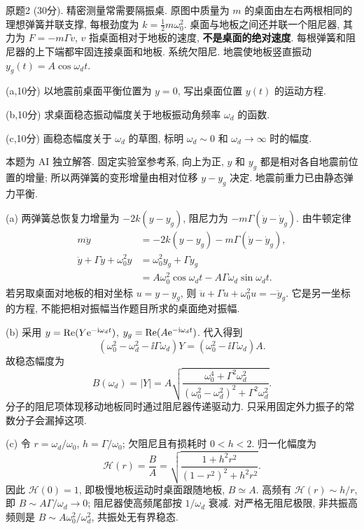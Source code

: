 \begin{exercise}\label{exam:actual1.2}
原题2 (30分). 精密测量常需要隔振桌. 原图中质量为 $m$ 的桌面由左右两根相同的理想弹簧并联支撑, 每根劲度为 $k=\tfrac12m\omega_0^2$. 桌面与地板之间还并联一个阻尼器, 其力为 $F=-m\Gamma v$, $v$ 指桌面相对于地板的速度, \textbf{不是桌面的绝对速度}. 每根弹簧和阻尼器的上下端都牢固连接桌面和地板. 系统欠阻尼. 地震使地板竖直振动 $y_g(t)=A\cos\omega_dt$.

(a,10分) 以地震前桌面平衡位置为 $y=0$, 写出桌面位置 $y(t)$ 的运动方程.

(b,10分) 求桌面稳态振动幅度关于地板振动角频率 $\omega_d$ 的函数.

(c,10分) 画稳态幅度关于 $\omega_d$ 的草图, 标明 $\omega_d\sim0$ 和 $\omega_d\to\infty$ 时的幅度.
\end{exercise}
\begin{solution}
本题为 AI 独立解答. 固定实验室参考系, 向上为正, $y$ 和 $y_g$ 都是相对各自地震前位置的增量; 所以两弹簧的变形增量由相对位移 $y-y_g$ 决定. 地震前重力已由静态弹力平衡.

(a) 两弹簧总恢复力增量为 $-2k(y-y_g)$, 阻尼力为 $-m\Gamma(\dot y-\dot y_g)$. 由牛顿定律
\begin{align*}
m\ddot y&=-2k(y-y_g)-m\Gamma(\dot y-\dot y_g),\\
\ddot y+\Gamma\dot y+\omega_0^2y
&=\omega_0^2y_g+\Gamma\dot y_g\\
&=A\omega_0^2\cos\omega_dt-A\Gamma\omega_d\sin\omega_dt.
\end{align*}
若另取桌面对地板的相对坐标 $u=y-y_g$, 则 $\ddot u+\Gamma\dot u+\omega_0^2u=-\ddot y_g$. 它是另一坐标的方程, 不能把相对振幅当作题目所求的桌面绝对振幅.

(b) 采用 $y=\operatorname{Re}(Y\mathrm e^{-\mathrm i\omega_dt})$, $y_g=\operatorname{Re}(A\mathrm e^{-\mathrm i\omega_dt})$. 代入得到
\[
(\omega_0^2-\omega_d^2-\ii\Gamma\omega_d)Y
=(\omega_0^2-\ii\Gamma\omega_d)A.
\]
故稳态幅度为
\[
B(\omega_d)=|Y|=A\sqrt{\frac{\omega_0^4+\Gamma^2\omega_d^2}{(\omega_0^2-\omega_d^2)^2+\Gamma^2\omega_d^2}}.
\]
分子的阻尼项体现移动地板同时通过阻尼器传递驱动力. 只采用固定外力振子的常数分子会漏掉这项.

(c) 令 $r=\omega_d/\omega_0$, $h=\Gamma/\omega_0$; 欠阻尼且有损耗时 $0<h<2$. 归一化幅度为
\[
\mathcal H(r)=\frac BA=\sqrt{\frac{1+h^2r^2}{(1-r^2)^2+h^2r^2}}.
\]
因此 $\mathcal H(0)=1$, 即极慢地板运动时桌面跟随地板, $B\simeq A$. 高频有 $\mathcal H(r)\sim h/r$, 即 $B\sim A\Gamma/\omega_d\to0$; 阻尼器使高频尾部按 $1/\omega_d$ 衰减. 对严格无阻尼极限, 非共振高频则是 $B\sim A\omega_0^2/\omega_d^2$, 共振处无有界稳态.


\end{solution}
